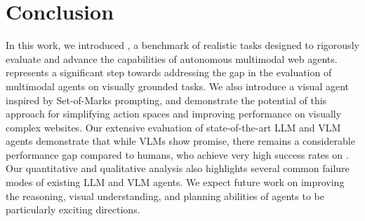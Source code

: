 \section{Conclusion}

In this work, we introduced \BenchmarkName{}, a benchmark of realistic tasks designed to rigorously evaluate and advance the capabilities of autonomous multimodal web agents. 
\BenchmarkName{} represents a significant step towards addressing the gap in the evaluation of multimodal agents on visually grounded tasks. 
We also introduce a visual agent inspired by Set-of-Marks prompting, and demonstrate the potential of this approach for simplifying action spaces and improving performance on visually complex websites. 
Our extensive evaluation of state-of-the-art LLM and VLM agents demonstrate that while VLMs show promise, there remains a considerable performance gap compared to humans, who achieve very high success rates on \BenchmarkName{}. 
Our quantitative and qualitative analysis also highlights several common failure modes of existing LLM and VLM agents. We expect future work on improving the reasoning, visual understanding, and planning abilities of agents to be particularly exciting directions.